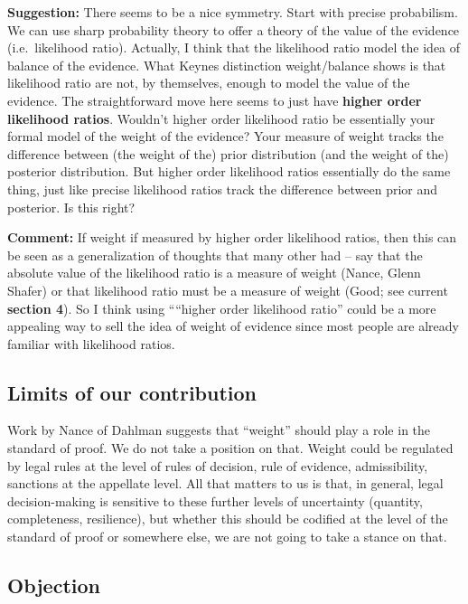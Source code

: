 \documentclass[
  10pt,
  dvipsnames,enabledeprecatedfontcommands]{scrartcl}
\begin{document}
\textbf{Suggestion:} There seems to be a nice symmetry. Start with
precise probabilism. We can use sharp probability theory to offer a
theory of the value of the evidence (i.e.~likelihood ratio). Actually, I
think that the likelihood ratio model the idea of balance of the
evidence. What Keynes distinction weight/balance shows is that
likelihood ratio are not, by themselves, enough to model the value of
the evidence. The straightforward move here seems to just have
\textbf{higher order likelihood ratios}. Wouldn't higher order
likelihood ratio be essentially your formal model of the weight of the
evidence? Your measure of weight tracks the difference between (the
weight of the) prior distribution (and the weight of the) posterior
distribution. But higher order likelihood ratios essentially do the same
thing, just like precise likelihood ratios track the difference between
prior and posterior. Is this right? 

\textbf{Comment:} If weight if measured by higher order likelihood
ratios, then this can be seen as a generalization of thoughts that many
other had -- say that the absolute value of the likelihood ratio is a
measure of weight (Nance, Glenn Shafer) or that likelihood ratio must be
a measure of weight (Good; see current \textbf{section 4}). So I think
using ````higher order likelihood ratio'' could be a more appealing way
to sell the idea of weight of evidence since most people are already
familiar with likelihood ratios.

\hypertarget{limits-of-our-contribution}{%
\subsection{Limits of our
contribution}\label{limits-of-our-contribution}}

Work by Nance of Dahlman suggests that ``weight'' should play a role in
the standard of proof. We do not take a position on that. Weight could
be regulated by legal rules at the level of rules of decision, rule of
evidence, admissibility, sanctions at the appellate level. All that
matters to us is that, in general, legal decision-making is sensitive to
these further levels of uncertainty (quantity, completeness,
resilience), but whether this should be codified at the level of the
standard of proof or somewhere else, we are not going to take a stance
on that.

\hypertarget{objection}{%
\subsection{Objection}\label{objection}}
\end{document}
